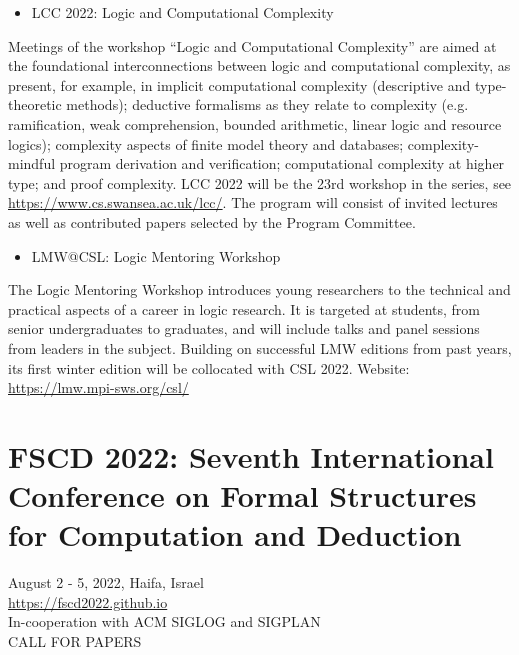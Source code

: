 \documentclass[prodmode,acmtecs]{acmsmall} %
\begin{document}
\begin{itemize}
\begin{itemize}\item  LCC 2022: Logic and Computational Complexity
\end{itemize} 
    Meetings of the workshop ``Logic and Computational Complexity'' are aimed at the foundational interconnections between logic and computational complexity, as present, for example, in implicit computational complexity (descriptive and type-theoretic methods); deductive formalisms as they relate to complexity (e.g. ramification, weak comprehension, bounded arithmetic, linear logic and resource logics); complexity aspects of finite model theory and databases; complexity-mindful program derivation and verification; computational complexity at higher type; and proof complexity. LCC 2022 will be the 23rd workshop in the series, see \href{https://www.cs.swansea.ac.uk/lcc/}{https://www.cs.swansea.ac.uk/lcc/}. The program will consist of invited lectures as well as contributed papers selected by the Program Committee. 
 
\begin{itemize}\item  LMW@CSL: Logic Mentoring Workshop
\end{itemize} 
    The Logic Mentoring Workshop introduces young researchers to the technical and practical aspects of a career in logic research. It is targeted at students, from senior undergraduates to graduates, and will include talks and panel sessions from leaders in the subject. Building on successful LMW editions from past years, its first winter edition will be collocated with CSL 2022. Website: \href{https://lmw.mpi-sws.org/csl/}{https://lmw.mpi-sws.org/csl/} 
 
\end{itemize}\section{FSCD 2022: Seventh International Conference on Formal Structures for Computation and Deduction }\label{FSCD2022}  August 2 - 5, 2022, Haifa, Israel\\ 
  \href{https://fscd2022.github.io}{https://fscd2022.github.io}\\ 
  In-cooperation with ACM SIGLOG and SIGPLAN\\ 
CALL FOR PAPERS 
\end{document}
